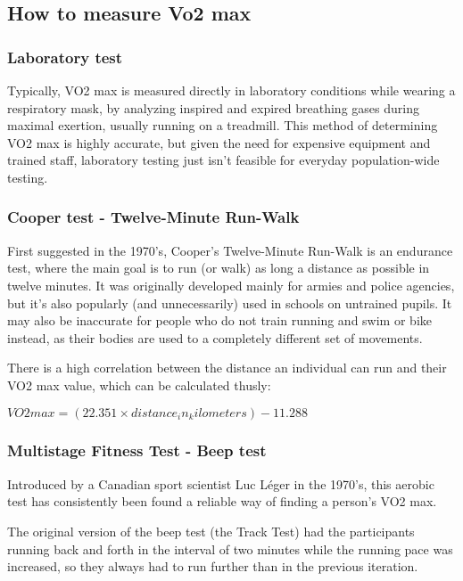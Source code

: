 \subsection{How to measure Vo2 max}

\subsubsection*{Laboratory test}

Typically, VO2 max is measured directly in laboratory conditions while wearing a respiratory mask, by analyzing inspired and expired breathing gases during maximal exertion,\cite{vo2max-definition} usually running on a treadmill.
This method of determining VO2 max is highly accurate, but given the need for expensive equipment and trained staff, laboratory testing just isn't feasible for everyday population-wide testing.

\subsubsection*{Cooper test - Twelve-Minute Run-Walk}

First suggested in the 1970's, Cooper's Twelve-Minute Run-Walk is an endurance test, where the main goal is to run (or walk) as long a distance as possible in twelve minutes.
It was originally developed mainly for armies and police agencies, but it's also popularly (and unnecessarily\cite{cooper-pupils}) used in schools on untrained pupils.
It may also be inaccurate for people who do not train running and swim or bike instead, as their bodies are used to a completely different set of movements.

There is a high correlation between the distance an individual can run and their VO2 max value, which can be calculated thusly:

$VO2max = (22.351 \times distance_in_kilometers) - 11.288$\cite{cooper-vo2max}

\subsubsection*{Multistage Fitness Test - Beep test}

Introduced by a Canadian sport scientist Luc Léger in the 1970's, this aerobic test has consistently been found a reliable way of finding a person's VO2 max.

The original version of the beep test (the Track Test) had the participants running back and forth in the interval of two minutes while the running pace was increased, so they always had to run further than in the previous iteration.

